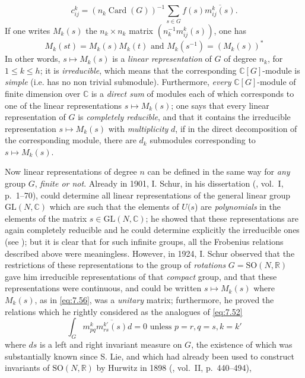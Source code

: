 \documentclass[12pt,a4paper,leqno,twoside]{extbook}
\newcommand{\C}{\mathbb{C}}
\newcommand{\R}{\mathbb{R}}
\newcommand{\Card}{\operatorname{Card}}
\begin{document}
\begin{equation}
    \label{eq:7.55}
    c^k_{ij} = (n_k \Card(G))^{-1} \sum_{s \in G} f(s)\overline{m^k_{ij}(s)}.
\end{equation}
If one writes \(M_k(s)\) the \(n_k \times n_k\) matrix \((n^{-1}_k m^k_{ij}(s))\), one has
\begin{equation}
    \label{eq:7.56}
    M_k(st) = M_k(s) M_k(t)
    \text{ and }
    M_k(s^{-1}) = (M_k(s))^*
\end{equation}
In other words, \(s \mapsto M_k(s)\) is a \emph{linear representation} of \(G\) of degree \(n_k\), for \(1 \leq k \leq h\); it is \emph{irreducible}, which means that the corresponding \(\C[G]\)-module is \emph{simple} (i.e. has no non trivial submodule). Furthermore, \emph{every} \(\C[G]\)-module of finite dimension over \(\C\) is a \emph{direct sum} of modules each of which corresponds to one of the linear representations \(s \mapsto M_k(s)\); one says that every linear representation of \(G\) is \emph{completely reducible}, and that it contains the irreducible representation \(s \mapsto M_k(s)\) with \emph{multiplicity} \(d\), if in the direct decomposition of the corresponding module, there are \(d_k\) submodules corresponding to \(s \mapsto M_k(s)\).

Now linear representations of degree \(n\) can be defined in the same way for \emph{any} group \(G\), \emph{finite or not}. Already in 1901, I. Schur, in his dissertation (\cite{193}, vol.~I, p.~1--70), could determine all linear representations of the general linear group \(\text{GL}(N,\C)\) which are such that the elements of \(U(s\)) are \emph{polynomials} in the elements of the matrix \(s \in \text{GL}(N,\C)\); he showed that these representations are again completely reducible and he could determine explicitly the irreducible ones (see \cite{053}); but it is clear that for such infinite groups, all the Frobenius relations described above were meaningless. However, in 1924, I. Schur observed that the restrictions of these representations to the group of \emph{rotations} \(G = \text{SO}(N,\R)\) gave him irreducible representations of that \emph{compact} group, and that these representations were continuous, and could be written \(s \mapsto M_k(s)\) where \(M_k(s)\), as in \eqref{eq:7.56}, was a \emph{unitary} matrix; furthermore, he proved the relations which he rightly considered as the analogues of \eqref{eq:7.52}
\begin{equation}
    \label{eq:7.57}
    \int_G m^k_{pq} \overline{m^{k'}_{rs}(s)}d = 0
    \text{ unless }
    p=r, q=s, k=k'
\end{equation}
where \(ds\) is a left and right invariant measure on \(G\), the existence of which was substantially known since S. Lie, and which had already been used to construct invariants of \(\text{SO}(N,\R)\) by Hurwitz in 1898 (\cite{193}, vol.~II, p.~440--494),
\end{document}
